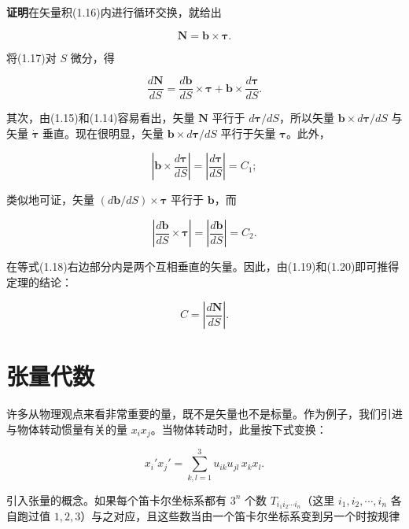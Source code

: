 \documentclass[11pt,a4paper,oneside]{ctexbook}
\newcommand{\ve}[1]{\bm{#1}}
\begin{document}
\textbf{证明}\quad 在矢量积(1.16)内进行循环交换，就给出

\begin{equation}
\ve{N} = \ve{b} \times \ve{\tau}.
\tag{1.17}
\end{equation}

将(1.17)对 $S$ 微分，得

\begin{equation}
\frac{d\ve{N}}{dS} = \frac{d\ve{b}}{dS} \times \ve{\tau} + \ve{b} \times \frac{d\ve{\tau}}{dS}.
\tag{1.18}
\end{equation}

其次，由(1.15)和(1.14)容易看出，矢量 $\ve{N}$ 平行于 $d\ve{\tau}/dS$，所以矢量 $\ve{b} \times d\ve{\tau}/dS$ 与矢量 $\dot{\ve{\tau}}$ 垂直。现在很明显，矢量 $\ve{b} \times d\ve{\tau}/dS$ 平行于矢量 $\ve{\tau}$。此外，

\begin{equation}
\left|\ve{b} \times \frac{d\ve{\tau}}{dS}\right| = \left|\frac{d\ve{\tau}}{dS}\right| = C_1;
\tag{1.19}
\end{equation}

类似地可证，矢量 $(d\ve{b}/dS) \times \ve{\tau}$ 平行于 $\ve{b}$，而

\begin{equation}
\left|\frac{d\ve{b}}{dS} \times \ve{\tau}\right| = \left|\frac{d\ve{b}}{dS}\right| = C_2.
\tag{1.20}
\end{equation}

在等式(1.18)右边部分内是两个互相垂直的矢量。因此，由(1.19)和(1.20)即可推得定理的结论：

\begin{equation*}
C = \left|\frac{d\ve{N}}{dS}\right|.
\end{equation*}

\section{张量代数}

许多从物理观点来看非常重要的量，既不是矢量也不是标量。作为例子，我们引进与物体转动惯量有关的量 $x_i x_j$。当物体转动时，此量按下式变换：

\begin{equation*}
x_i' x_j' = \sum_{k,l=1}^{3} u_{ik} u_{jl}\, x_k x_l.
\end{equation*}

引入张量的概念。如果每个笛卡尔坐标系都有 $3^{n}$ 个数 $T_{i_1 i_2 \cdots i_n}$（这里 $i_1, i_2, \cdots, i_n$ 各自跑过值 $1, 2, 3$）与之对应，且这些数当由一个笛卡尔坐标系变到另一个时按规律
\end{document}
